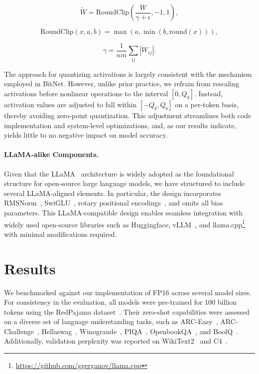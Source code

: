 \begin{equation}
    \widetilde{W} = \mathrm{RoundClip}(\frac{W}{\gamma + \epsilon}, -1, 1),
\end{equation}

\begin{equation}
    \mathrm{RoundClip}(x, a, b) = \max(a, \min(b, \mathrm{round}(x))),
\end{equation}

\begin{equation}
    \gamma = \frac{1}{nm}\sum_{ij} |W_{ij}|.
\end{equation}

The approach for quantizing activations is largely consistent with the mechanism employed in BitNet. However, unlike prior practice, we refrain from rescaling activations before nonlinear operations to the interval $[0, Q_b]$. Instead, activation values are adjusted to fall within $[-Q_b, Q_b]$ on a per-token basis, thereby avoiding zero-point quantization. This adjustment streamlines both code implementation and system-level optimizations, and, as our results indicate, yields little to no negative impact on model accuracy.

\paragraph{LLaMA-alike Components.}

Given that the LLaMA~\cite{llama, llama2} architecture is widely adopted as the foundational structure for open-source large language models, we have structured  to include several LLaMA-aligned elements. In particular, the design incorporates RMSNorm~\cite{rmsnorm}, SwiGLU~\cite{swiglu}, rotary positional encodings~\cite{rope}, and omits all bias parameters. This LLaMA-compatible design enables seamless integration with widely used open-source libraries such as Huggingface, vLLM~\cite{vllm}, and llama.cpp\footnote{\url{https://github.com/ggerganov/llama.cpp}} with minimal modifications required.

\section{Results}

We benchmarked  against our implementation of FP16  across several model sizes. For consistency in the evaluation, all models were pre-trained for 100 billion tokens using the RedPajama dataset~\cite{redpajama}. Their zero-shot capabilities were assessed on a diverse set of language understanding tasks, such as ARC-Easy~\cite{arc}, ARC-Challenge~\cite{arc}, Hellaswag~\cite{hellaswag}, Winogrande~\cite{winoGrande}, PIQA~\cite{piqa}, OpenbookQA~\cite{openbookqa}, and BoolQ~\cite{boolq}. Additionally, validation perplexity was reported on WikiText2~\cite{wikitext2} and C4~\cite{c4}.

